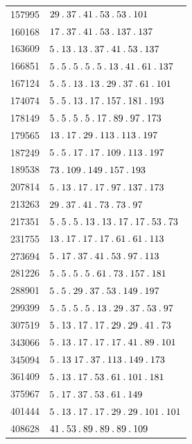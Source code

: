 \begin{longtable}{@{}r|l@{}}
157995 & $29\pdot 37\pdot 41\pdot 53\pdot 53\pdot 101$\\
160168 & $17\pdot 37\pdot 41\pdot 53\pdot 137\pdot 137$\\
163609 & $5\pdot 13\pdot 13\pdot 37\pdot 41\pdot 53\pdot 137$\\
166851 & $5\pdot 5\pdot 5\pdot 5\pdot 5\pdot 13\pdot 41\pdot 61\pdot 137$\\
167124 & $5\pdot 5\pdot 13\pdot 13\pdot 29\pdot 37\pdot 61\pdot 101$\\
174074 & $5\pdot 5\pdot 13\pdot 17\pdot 157\pdot 181\pdot 193$\\
178149 & $5\pdot 5\pdot 5\pdot 5\pdot 17\pdot 89\pdot 97\pdot 173$\\
179565 & $13\pdot 17\pdot 29\pdot 113\pdot 113\pdot 197$\\
187249 & $5\pdot 5\pdot 17\pdot 17\pdot 109\pdot 113\pdot 197$\\
189538 & $73\pdot 109\pdot 149\pdot 157\pdot 193$\\
207814 & $5\pdot 13\pdot 17\pdot 17\pdot 97\pdot 137\pdot 173$\\
213263 & $29\pdot 37\pdot 41\pdot 73\pdot 73\pdot 97$\\
217351 & $5\pdot 5\pdot 5\pdot 13\pdot 13\pdot 17\pdot 17\pdot 53\pdot 73$\\
231755 & $13\pdot 17\pdot 17\pdot 17\pdot 61\pdot 61\pdot 113$\\
273694 & $5\pdot 17\pdot 37\pdot 41\pdot 53\pdot 97\pdot 113$\\
281226 & $5\pdot 5\pdot 5\pdot 5\pdot 61\pdot 73\pdot 157\pdot 181$\\
288901 & $5\pdot 5\pdot 29\pdot 37\pdot 53\pdot 149\pdot 197$\\
299399 & $5\pdot 5\pdot 5\pdot 5\pdot 13\pdot 29\pdot 37\pdot 53\pdot 97$\\
307519 & $5\pdot 13\pdot 17\pdot 17\pdot 29\pdot 29\pdot 41\pdot 73$\\
343066 & $5\pdot 13\pdot 17\pdot 17\pdot 17\pdot 41\pdot 89\pdot 101$\\
345094 & $5\pdot 13\;17\pdot 37\pdot 113\pdot 149\pdot 173$\\
361409 & $5\pdot 13\pdot 17\pdot 53\pdot 61\pdot 101\pdot 181$\\
375967 & $5\pdot 17\pdot 37\pdot 53\pdot 61\pdot 149$\\
401444 & $5\pdot 13\pdot 17\pdot 17\pdot 29\pdot 29\pdot 101\pdot 101$\\
408628 & $41\pdot 53\pdot 89\pdot 89\pdot 89\pdot 109$\\

\end{longtable}
